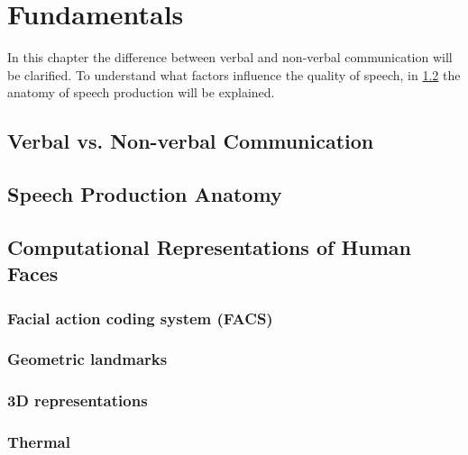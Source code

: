 \chapter{Fundamentals}
\label{cha:fundamentals}

In this chapter the difference between verbal and non-verbal communication will be clarified. To understand what factors influence the quality of speech, in \ref{sec:anatomy} the anatomy of speech production will be explained.  



\section{Verbal vs. Non-verbal Communication} %
\label{sec:communication}


\section{Speech Production Anatomy} %
\label{sec:anatomy}


\section{Computational Representations of Human Faces}

\subsection{Facial action coding system (FACS)}




\subsection{Geometric landmarks}

\subsection{3D representations}

\subsection{Thermal}


